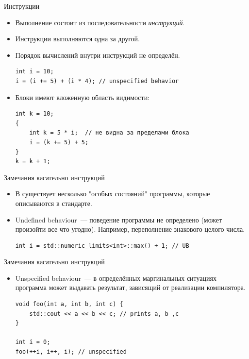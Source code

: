 \documentclass[aspectration=1610,t]{beamer}
\begin{document}
\begin{frame}[fragile]{Инструкции}
    \begin{itemize}
        \item Выполнение состоит из последовательности {\em инструкций}.
        \item Инструкции выполняются одна за другой.
        \item Порядок вычислений внутри инструкций не определён.
            \begin{lstlisting}
int i = 10;
i = (i += 5) + (i * 4); // unspecified behavior
            \end{lstlisting}
        \item Блоки имеют вложенную область видимости:
            \begin{lstlisting}
int k = 10;                
{   
    int k = 5 * i;  // не видна за пределами блока
    i = (k += 5) + 5; 
}
k = k + 1;
            \end{lstlisting}

    \end{itemize}
\end{frame}

\begin{frame}[fragile]{Замечания касательно инструкций}
    \begin{itemize}
        \item В \langcpp существует несколько "особых состояний" программы,
            которые описываются в стандарте.
        \item Undefined behaviour~--- поведение программы не определено (может произойти все что угодно).
            Например, переполнение знакового целого числа.
            \begin{lstlisting}
int i = std::numeric_limits<int>::max() + 1; // UB
            \end{lstlisting}
    \end{itemize}
\end{frame}

\begin{frame}[fragile]{Замечания касательно инструкций}
    \begin{itemize}
        \item Unspecified behaviour~--- в определённых маргинальных ситуациях программа может выдавать результат, 
            зависящий от реализации компилятора.
            \begin{lstlisting}
void foo(int a, int b, int c) {
    std::cout << a << b << c; // prints a, b ,c
}

int i = 0;
foo(++i, i++, i); // unspecified
            \end{lstlisting}
    \end{itemize}
\end{frame}
\end{document}
